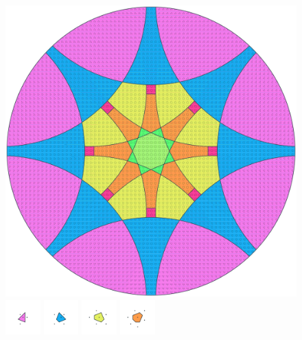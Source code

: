 \documentclass[text.tex]{subfiles}
\begin{document}
\clearpage
\pagestyle{fancy}
\fancyhf{}
\begin{figure}[h!]
\centering
\includegraphics[width=1\textwidth]{img/results/circle8/circle8_165366_(10535_-4361alpha_4).pdf}
\includegraphics[width=0.12\textwidth]{img/results/circle8/circle8_165366_(10535_-4361alpha_4)_001.pdf}
\includegraphics[width=0.12\textwidth]{img/results/circle8/circle8_165366_(10535_-4361alpha_4)_002.pdf}
\includegraphics[width=0.12\textwidth]{img/results/circle8/circle8_165366_(10535_-4361alpha_4)_003.pdf}
\includegraphics[width=0.12\textwidth]{img/results/circle8/circle8_165366_(10535_-4361alpha_4)_004.pdf}

\end{figure}
\end{document}
